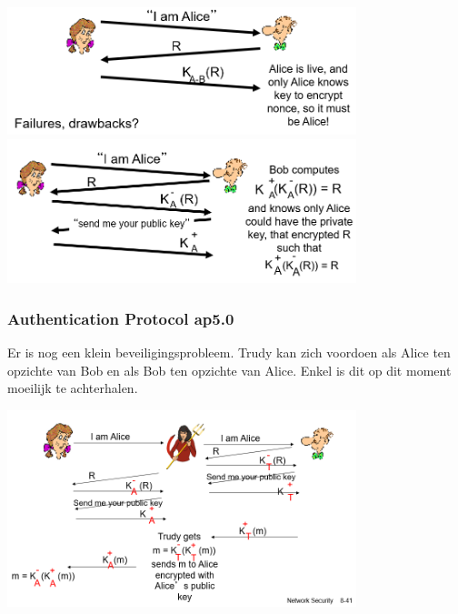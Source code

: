 \includegraphics[width=4in]{./img/imghfdst8/hfdst8puntje20.png}\\[1cm]

\includegraphics[width=4in]{./img/imghfdst8/hfdst8puntje21.png}\\[1cm]
 

\subsubsection{Authentication Protocol ap5.0}

Er is nog een klein beveiligingsprobleem. Trudy kan zich voordoen als Alice ten opzichte van Bob en als Bob ten opzichte van Alice. Enkel is dit op dit moment moeilijk te achterhalen.

\includegraphics[width=4in]{./img/imghfdst8/hfdst8puntje22.png}\\[1cm]
 